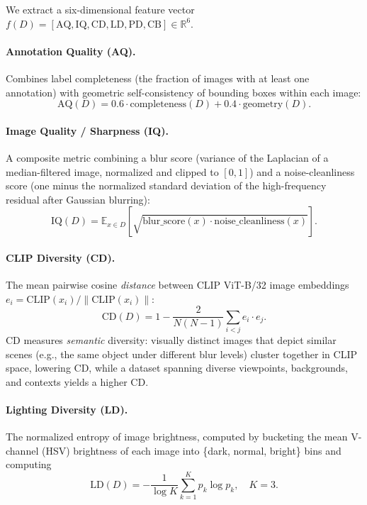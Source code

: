 \documentclass[11pt]{article}
\begin{document}
We extract a six-dimensional feature vector $f(D) = [\mathrm{AQ}, \mathrm{IQ},
\mathrm{CD}, \mathrm{LD}, \mathrm{PD}, \mathrm{CB}] \in \mathbb{R}^6$.

\paragraph{Annotation Quality (AQ).} Combines label completeness (the
fraction of images with at least one annotation) with geometric
self-consistency of bounding boxes within each image:
\begin{equation}
\mathrm{AQ}(D) = 0.6 \cdot \mathrm{completeness}(D) + 0.4 \cdot \mathrm{geometry}(D).
\end{equation}

\paragraph{Image Quality / Sharpness (IQ).} A composite metric combining a
blur score (variance of the Laplacian of a median-filtered image, normalized
and clipped to $[0,1]$) and a noise-cleanliness score (one minus the
normalized standard deviation of the high-frequency residual after Gaussian
blurring):
\begin{equation}
\mathrm{IQ}(D) = \mathbb{E}_{x \in D}\left[\sqrt{\mathrm{blur\_score}(x) \cdot \mathrm{noise\_cleanliness}(x)}\right].
\end{equation}

\paragraph{CLIP Diversity (CD).} The mean pairwise cosine \emph{distance}
between CLIP ViT-B/32 image embeddings $e_i = \mathrm{CLIP}(x_i) /
\|\mathrm{CLIP}(x_i)\|$:
\begin{equation}
\mathrm{CD}(D) = 1 - \frac{2}{N(N-1)} \sum_{i<j} e_i \cdot e_j.
\end{equation}
CD measures \emph{semantic} diversity: visually distinct images that depict
similar scenes (e.g., the same object under different blur levels) cluster
together in CLIP space, lowering CD, while a dataset spanning diverse
viewpoints, backgrounds, and contexts yields a higher CD.

\paragraph{Lighting Diversity (LD).} The normalized entropy of image
brightness, computed by bucketing the mean V-channel (HSV) brightness of each
image into \{dark, normal, bright\} bins and computing
\begin{equation}
\mathrm{LD}(D) = -\frac{1}{\log K}\sum_{k=1}^{K} p_k \log p_k, \quad K=3.
\end{equation}
\end{document}
